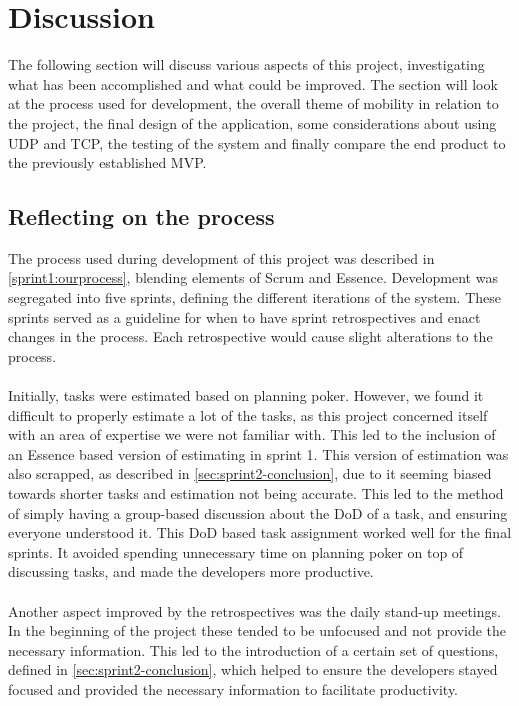 \section{Discussion}
The following section will discuss various aspects of this project, investigating what has been accomplished and what could be improved.
The section will look at the process used for development, the overall theme of mobility in relation to the project, the final design of the application, some considerations about using UDP and TCP, the testing of the system and finally compare the end product to the previously established MVP. 

\subsection{Reflecting on the process}
The process used during development of this project was described in \autoref{sprint1:ourprocess}, blending elements of Scrum and Essence.
Development was segregated into five sprints, defining the different iterations of the system.
These sprints served as a guideline for when to have sprint retrospectives and enact changes in the process.
Each retrospective would cause slight alterations to the process.
\\\\
Initially, tasks were estimated based on planning poker.
However, we found it difficult to properly estimate a lot of the tasks, as this project concerned itself with an area of expertise we were not familiar with.
This led to the inclusion of an Essence based version of estimating in sprint 1.
This version of estimation was also scrapped, as described in \autoref{sec:sprint2-conclusion}, due to it seeming biased towards shorter tasks and estimation not being accurate.
This led to the method of simply having a group-based discussion about the DoD of a task, and ensuring everyone understood it.
This DoD based task assignment worked well for the final sprints.
It avoided spending unnecessary time on planning poker on top of discussing tasks, and made the developers more productive.
\\\\
Another aspect improved by the retrospectives was the daily stand-up meetings.
In the beginning of the project these tended to be unfocused and not provide the necessary information.
This led to the introduction of a certain set of questions, defined in \autoref{sec:sprint2-conclusion}, which helped to ensure the developers stayed focused and provided the necessary information to facilitate productivity.
\\\\

